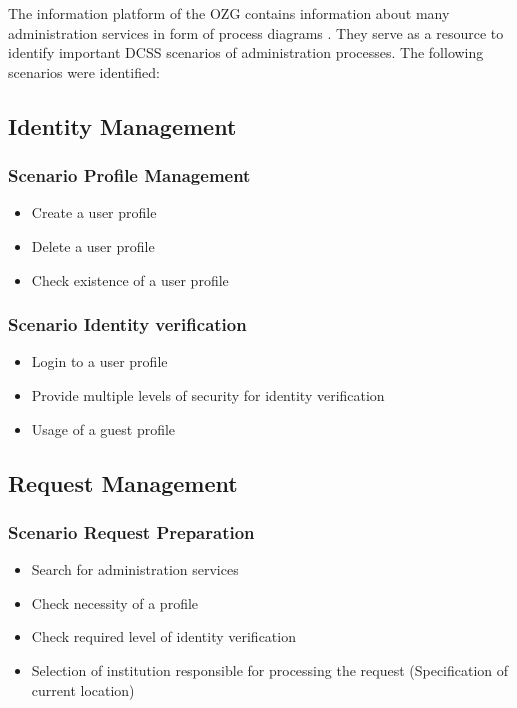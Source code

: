 \documentclass[
     12pt,         %
     a4paper,      %
     BCOR=10mm,version=first,     %
     DIV=14,version=first,        %
     ]{scrreprt}
\begin{document}
The information platform of the OZG contains information about many administration services in form of process diagrams \cite{BMI:Ergebnisse}. They serve as a resource to identify important DCSS scenarios of administration processes. The following scenarios were identified:

\subsection{Identity Management}

\subsubsection{Scenario Profile Management}
\begin{itemize}
    \item Create a user profile
    \item Delete a user profile
    \item Check existence of a user profile
\end{itemize}

\subsubsection{Scenario Identity verification}
\begin{itemize}
    \item Login to a user profile
    \item Provide multiple levels of security for identity verification
    \item Usage of a guest profile
\end{itemize}

\subsection{Request Management}

\subsubsection{Scenario Request Preparation}
\begin{itemize}
    \item Search for administration services
    \item Check necessity of a profile
    \item Check required level of identity verification
    \item Selection of institution responsible for processing the request (Specification of current location)
\end{itemize}
\end{document}
